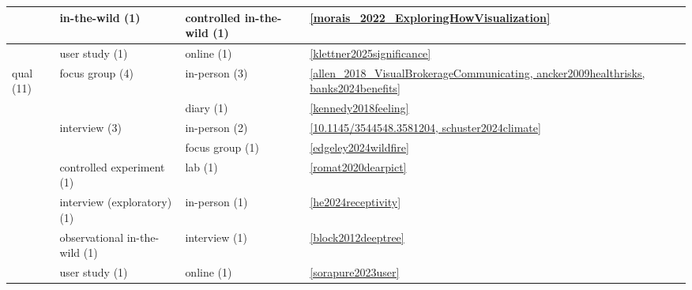 \begin{tabular}{|l|l|l|l|}
& in-the-wild (1) & controlled in-the-wild (1) & \ref{morais_2022_ExploringHowVisualization} \\ \hline
& user study (1) & online (1) & \ref{klettner2025significance} \\ \hline
\multirow{8}{*}{qual (11)} & \multirow{2}{*}{focus group (4)} & in-person (3) & \ref{allen_2018_VisualBrokerageCommunicating, ancker2009healthrisks, banks2024benefits} \\
& & diary (1) & \ref{kennedy2018feeling} \\ \hline
& \multirow{2}{*}{interview (3)} & in-person (2) & \ref{10.1145/3544548.3581204, schuster2024climate} \\
& & focus group (1) & \ref{edgeley2024wildfire} \\ \hline
& controlled experiment (1) & lab (1) & \ref{romat2020dearpict} \\ \hline
& interview (exploratory) (1) & in-person (1) & \ref{he2024receptivity} \\ \hline
& observational in-the-wild (1) & interview (1) & \ref{block2012deeptree} \\ \hline
& user study (1) & online (1) & \ref{sorapure2023user} \\ \hline
\bottomrule
\end{tabular}
